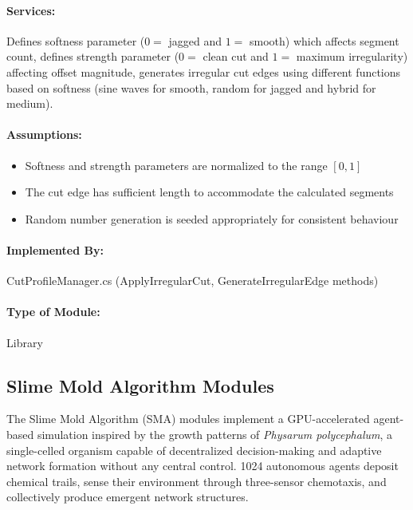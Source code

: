 \documentclass[12pt, titlepage]{article}
\begin{document}
\paragraph{Services:}
Defines softness parameter ($0 =$ jagged and $1 =$ smooth) which affects segment count, defines strength parameter ($0 =$ clean cut and $1 =$ maximum irregularity) affecting offset magnitude, generates irregular cut edges using different functions based on softness (sine waves for smooth, random for jagged and hybrid for medium).

\paragraph{Assumptions:}
\begin{itemize}
\item Softness and strength parameters are normalized to the range $[0, 1]$
\item The cut edge has sufficient length to accommodate the calculated segments
\item Random number generation is seeded appropriately for consistent behaviour
\end{itemize}

\paragraph{Implemented By:}
CutProfileManager.cs (ApplyIrregularCut, GenerateIrregularEdge
\newline
methods)

\paragraph{Type of Module:}
Library

\newpage

\subsection{Slime Mold Algorithm Modules}\label{SecSMA}

The Slime Mold Algorithm (SMA) modules implement a GPU-accelerated agent-based simulation
inspired by the growth patterns of \textit{Physarum polycephalum}, a single-celled organism
capable of decentralized decision-making and adaptive network formation without any central
control. 1024 autonomous agents deposit chemical trails, sense their environment through
three-sensor chemotaxis, and collectively produce emergent network structures.
\end{document}
